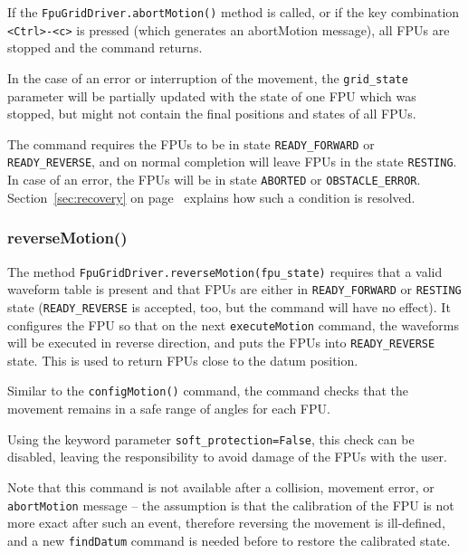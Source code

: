 \documentclass[11pt,a4paper]{scrartcl}
\begin{document}
If the \texttt{FpuGridDriver.abortMotion()} method is called, or if
the key combination \texttt{<Ctrl>-<c>} is pressed (which generates an
abortMotion message), all FPUs are stopped and the command returns.

In the case of an error or interruption of the movement, the
\texttt{grid\_state} parameter will be partially updated with the
state of one FPU which was stopped, but might not contain the final
positions and states of all FPUs.

The command requires the FPUs to be in state \texttt{READY\_FORWARD}
or \texttt{READY\_REVERSE}, and on normal completion will leave FPUs
in the state \texttt{RESTING}. In case of an error, the FPUs will be
in state \texttt{ABORTED} or \texttt{OBSTACLE\_ERROR}.
Section~\ref{sec:recovery} on page~\pageref{sec:recovery} explains how
such a condition is resolved.



\subsubsection{reverseMotion()}

\begin{sloppypar}
The method \texttt{FpuGridDriver.reverseMotion(fpu\_state)} requires
that a valid waveform table is present and that FPUs are either in
\texttt{READY\_FORWARD} or \texttt{RESTING} state
(\texttt{READY\_REVERSE} is accepted, too, but the command will have
no effect). It configures the FPU so that on the next
\texttt{executeMotion} command, the waveforms will be executed in
reverse direction, and puts the FPUs into \texttt{READY\_REVERSE}
state. This is used to return FPUs close to the datum position.
\end{sloppypar}

Similar to the \texttt{configMotion()} command, the command checks
that the movement remains in a safe range of angles for each
FPU.

Using the keyword parameter \texttt{soft\_protection=False}, this
check can be disabled, leaving the responsibility to avoid damage of
the FPUs with the user.


Note that this command is not available after a collision, movement
error, or \texttt{abortMotion} message -- the assumption is that the
calibration of the FPU is not more exact after such an event,
therefore reversing the movement is ill-defined, and a new
\texttt{findDatum} command is needed before to restore the calibrated
state.
\end{document}
